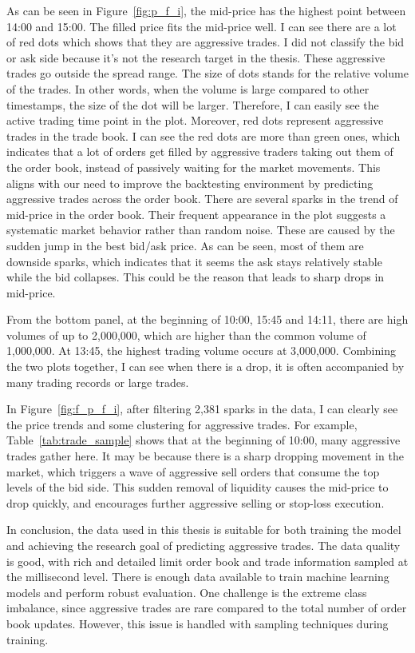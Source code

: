 As can be seen in Figure~\ref{fig:p_f_i}, the mid-price has the highest point between 14:00 and 15:00. The filled price fits the mid-price well. I can see there are a lot of red dots which shows that they are aggressive trades. I did not classify the bid or ask side because it's not the research target in the thesis. These aggressive trades go outside the spread range. The size of dots stands for the relative volume of the trades. In other words, when the volume is large compared to other timestamps, the size of the dot will be larger. Therefore, I can easily see the active trading time point in the plot. Moreover, red dots represent aggressive trades in the trade book. I can see the red dots are more than green ones, which indicates that a lot of orders get filled by aggressive traders taking out them of the order book, instead of passively waiting for the market movements. This aligns with our need to improve the backtesting environment by predicting aggressive trades across the order book. There are several sparks in the trend of mid-price in the order book. Their frequent appearance in the plot suggests a systematic market behavior rather than random noise. These are caused by the sudden jump in the best bid/ask price. As can be seen, most of them are downside sparks, which indicates that it seems the ask stays relatively stable while the bid collapses. This could be the reason that leads to sharp drops in mid-price.

From the bottom panel, at the beginning of 10:00, 15:45 and 14:11, there are high volumes of up to 2,000,000, which are higher than the common volume of 1,000,000. At 13:45, the highest trading volume occurs at 3,000,000. Combining the two plots together, I can see when there is a drop, it is often accompanied by many trading records or large trades. 

In Figure~\ref{fig:f_p_f_i}, after filtering 2,381 sparks in the data, I can clearly see the price trends and some clustering for aggressive trades. For example, Table~\ref{tab:trade_sample} shows that at the beginning of 10:00, many aggressive trades gather here. It may be because there is a sharp dropping movement in the market, which triggers a wave of aggressive sell orders that consume the top levels of the bid side. This sudden removal of liquidity causes the mid-price to drop quickly, and encourages further aggressive selling or stop-loss execution.  

In conclusion, the data used in this thesis is suitable for both training the model and achieving the research goal of predicting aggressive trades. The data quality is good, with rich and detailed limit order book and trade information sampled at the millisecond level. There is enough data available to train machine learning models and perform robust evaluation. One challenge is the extreme class imbalance, since aggressive trades are rare compared to the total number of order book updates. However, this issue is handled with sampling techniques during training.

